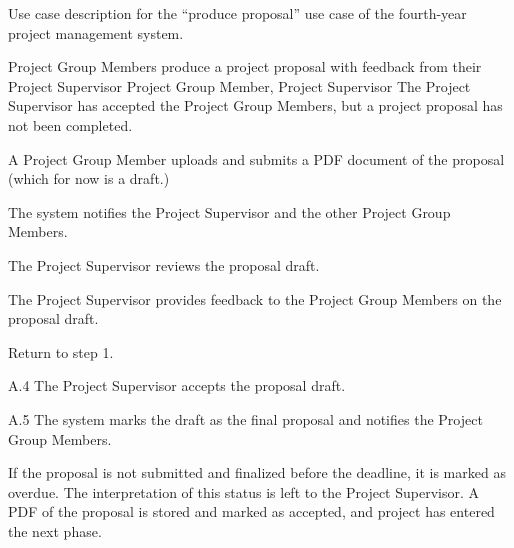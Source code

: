 \documentclass[document.tex]{subfiles}
\begin{document}
\begin{table}
  \centering
  \caption{Use case description for the ``produce proposal'' use case of the fourth-year project management system.}
  \label{tbl:use-case-produce-proposal}

  \begin{usecase}
    Project Group Members produce a project proposal with feedback from their Project Supervisor
    Project Group Member, Project Supervisor
    The Project Supervisor has accepted the Project Group Members, but a project proposal has not been completed.
    \ucnormal
    \begin{ucenum}
      \item A Project Group Member uploads and submits a PDF document of the proposal (which for now is a draft.)
      \item The system notifies the Project Supervisor and the other Project Group Members.
      \item The Project Supervisor reviews the proposal draft.
      \item The Project Supervisor provides feedback to the Project Group Members on the proposal draft.
      \item Return to step 1.
    \end{ucenum}
    \begin{ucenum}
      \item [A.4] The Project Supervisor accepts the proposal draft.
      \item [A.5] The system marks the draft as the final proposal and notifies the Project Group Members.
    \end{ucenum}
    If the proposal is not submitted and finalized before the deadline, it is marked as overdue. The interpretation of this status is left to the Project Supervisor.
    A PDF of the proposal is stored and marked as accepted, and project has entered the next phase.
  \end{usecase}
\end{table}
\end{document}
